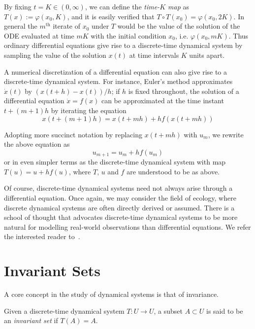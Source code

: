 By fixing $t=K \in (0,\infty)$, we can define the \emph{time-$K$ map} as  $T(x):= \varphi(x_0,K)$, and it is easily verified that $T\circ T(x_0) = \varphi(x_0,2K)$. In general the $m^{\mbox{th}}$ iterate of $x_0$ under $T$ would be the value of the solution of the ODE evaluated at time $mK$ with the initial condition $x_0$, i.e. $\varphi(x_0, mK)$. 
Thus ordinary differential equations give rise to a discrete-time dynamical system by sampling the value of the solution $x(t)$ at time intervals $K$ units apart. 


A numerical discretization of a differential equation can also give rise to a discrete-time dynamical system. For instance, Euler's method approximates $\dot{x}(t)$ by $(x(t+h)-x(t))/h$; if $h$ is fixed throughout, the solution of a differential equation $\dot{x}=f(x)$ 
can be approximated at the time instant $t+(m+1)h$ by iterating the equation 
\begin{equation}
  x(t+(m+1)h) = x(t+mh) + h f(x(t+mh))
\end{equation}

Adopting more succinct notation by replacing $x(t+mh)$ with $u_m$, we rewrite the above equation as
\begin{equation}
u_{m+1} = u_m + hf(u_m)
\end{equation}
or in even simpler terms as the discrete-time dynamical system with map $T(u) = u + hf(u)$, where $T$, $u$ and $f$ are understood to be as above.


Of course, discrete-time dynamical systems need not always arise through a differential equation. Once again, we may consider the field of ecology, where discrete dynamical systems are often directly derived or assumed. 
There is a school of thought that advocates discrete-time dynamical systems to be more natural for modelling real-world observations than differential equations. We refer the interested reader to~\cite{saber2010introduction}.


\section{Invariant Sets}

A core concept in the study of dynamical systems is that of invariance. 
\begin{Definition}
  \label{Dfn_InvariantSet}\rm
  Given a discrete-time dynamical system $T: U \to U$, a subset $A \subset U$ is said to be an \emph{invariant set} if $T(A) =A$. 
\end{Definition}

